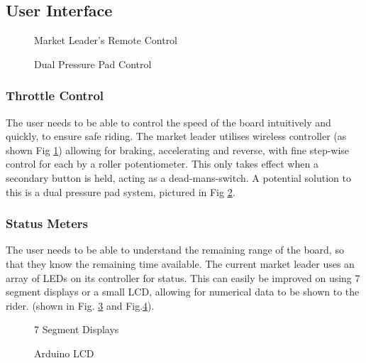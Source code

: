 \documentclass[journal,10pt]{IEEEtran}
\begin{document}
    \subsection{User Interface}
        \begin{figure}[H]
            \centering
            \caption{Market Leader's Remote Control}
            \label{fig:Boosted Remote}
        \end{figure}
        \begin{figure}[H]
            \centering
            \caption{Dual Pressure Pad Control}
            \label{fig:Pressure Pads}
        \end{figure}
            
    	\subsubsection{Throttle Control}
    		The user needs to be able to control the speed of the board intuitively and quickly, to ensure safe riding.
    		The market leader utilises wireless controller (as shown Fig \ref{fig:Boosted Remote}) allowing for braking, accelerating and reverse, with fine step-wise control for each by a roller potentiometer.
    		This only takes effect when a secondary button is held, acting as a dead-mans-switch.
    		A potential solution to this is a dual pressure pad system, pictured in Fig \ref{fig:Pressure Pads}.
            
    	\subsubsection{Status Meters}
    		The user needs to be able to understand the remaining range of the board, so that they know the remaining time available.
    		The current market leader uses an array of LEDs on its controller for status. This can easily be improved on using 7 segment displays or a small LCD, allowing for numerical data to be shown to the rider. (shown in Fig. \ref{fig:7 seg} and Fig.\ref{fig:LCD}).
    		
    	\begin{figure}[H]
            \centering
            \caption{7 Segment Displays}
            \label{fig:7 seg}
        \end{figure}
    	\begin{figure}[H]
            \centering
            \caption{Arduino LCD}
            \label{fig:LCD}
        \end{figure}
\end{document}
